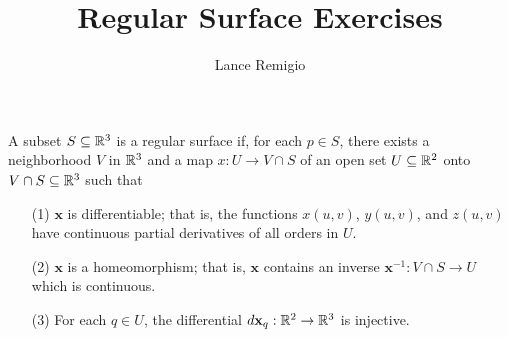 \documentclass[a4paper]{article}
\title{Regular Surface Exercises}
\author{Lance Remigio}
\begin{document}
\maketitle

\begin{definition}
    A subset \( S \subseteq \mathbb{R}^{3} \) is a regular surface if, for each \( p \in S  \), there exists a neighborhood \( V  \) in \( \mathbb{R}^{3} \) and a map \( x: U \to V \cap S  \) of an open set \( U \subseteq  \mathbb{R}^{2} \) onto \( V \cap S \subseteq \mathbb{R}^{3}  \) such that 
    \begin{enumerate}
        \item[(1)] \( \textbf{x}   \) is differentiable; that is, the functions \( x(u,v)  \), \( y(u,v) \), and \( z(u,v) \) have continuous partial derivatives of all orders in \( U  \).
        \item[(2)] \( \textbf{x} \) is a homeomorphism; that is, \( \textbf{x} \) contains an inverse \( \textbf{x}^{-1}: V \cap S \to U  \) which is continuous.
        \item[(3)] For each \( q \in U  \), the differential \( d \textbf{x}_q : \mathbb{R}^{2} \to \mathbb{R}^{3} \) is injective.
    \end{enumerate}
\end{definition}
\end{document}
